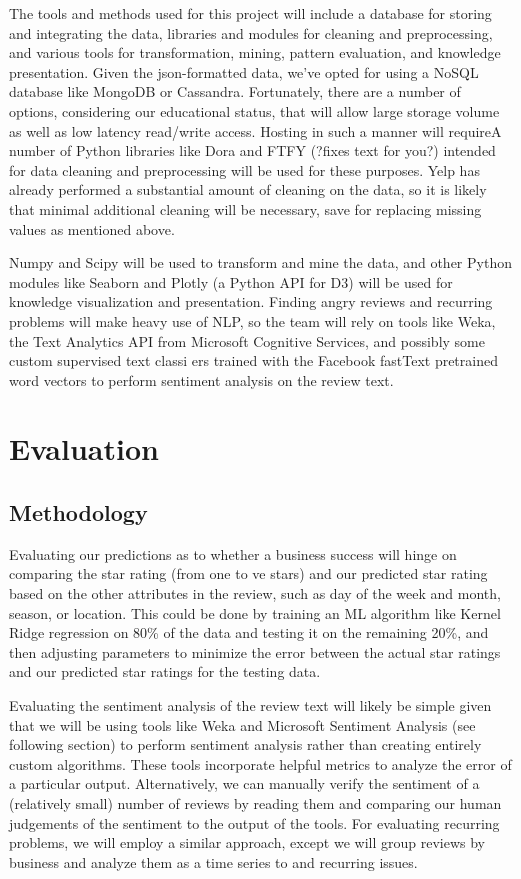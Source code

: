 \quad The tools and methods used for this project will include a database for storing and integrating the data, libraries and modules for cleaning and preprocessing, and various tools for transformation, mining, pattern evaluation, and knowledge presentation. Given the json-formatted data, we've opted for using a NoSQL database like MongoDB or Cassandra. Fortunately, there are a number of options, considering our educational status, that will allow large storage volume as well as low latency read/write access. Hosting in such a manner will requireA number of Python libraries like Dora and FTFY (?fixes text for you?) intended for data cleaning and preprocessing will be used for these purposes. Yelp has already performed a substantial amount of cleaning on the data, so it is likely that minimal additional cleaning will be necessary, save for replacing missing values as mentioned above.

\quad Numpy and Scipy will be used to transform and mine the data, and other Python modules like Seaborn and Plotly (a Python API for D3) will be used for knowledge visualization and presentation. Finding angry reviews and recurring problems will make heavy use of NLP, so the team will rely on tools like Weka, the Text Analytics API from Microsoft Cognitive Services, and possibly some custom supervised text classi ers trained with the Facebook fastText pretrained word vectors to perform sentiment analysis on the review text.


\section{Evaluation}

\subsection{Methodology}

\quad Evaluating our predictions as to whether a business success will hinge on comparing the star rating (from one to  ve stars) and our predicted star rating based on the other attributes in the review, such as day of the week and month, season, or location. This could be done by training an ML algorithm like Kernel Ridge regression on 80\% of the data and testing it on the remaining 20\%, and then adjusting parameters to minimize the error between the actual star ratings and our predicted star ratings for the testing data.

\quad Evaluating the sentiment analysis of the review text will likely be simple given that we will be using tools like Weka and Microsoft Sentiment Analysis (see following section) to perform sentiment analysis rather than creating entirely custom algorithms. These tools incorporate helpful metrics to analyze the error of a particular output. Alternatively, we can manually verify the sentiment of a (relatively small) number of reviews by reading them and comparing our human judgements of the sentiment to the output of the tools. For evaluating recurring problems, we will employ a similar approach, except we will group reviews by business and analyze them as a time series to and recurring issues.

